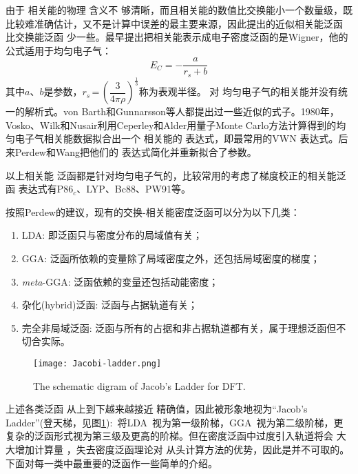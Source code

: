 由于%
相关能的物理%
{含}义不%
{够}清晰，而且相关能的数值比交换能小一个数量级，既比较难准确估计，又不是计算中误差的最主要来源，因此提出的{近似}相关能泛函%
比交换能泛函%
少一些。最早提出把相关能表示成电子密度泛函的是Wigner\cite{PR46-1002_1934}，他的公式适用于均匀电子气：
\begin{equation}
  E_C=-\dfrac a{r_s+b}
  \label{eq:dft-16}
\end{equation}
其中$a$、$b$是参数，$r_s$\,=\,$\left(\dfrac3{4\pi\rho}\right)^{\frac13}$称为表观半径。%
对%
均匀电子气的相关能并没有统一\linebreak 的解析式。von Barth\cite{JPC5-1629_1972}和Gunnarsson\cite{PRB13-4274_1976}等人都提出过一些近似的式子。1980年，\linebreak Vosko、Wilk和Nusair\cite{CJP58-1200_1980}利用Ceperley和Alder\cite{PRL45-566_1980}用量子Monte Carlo方法计算得到的{均匀电子气}相关能数据拟合出一个%
相关能的%
{表达}式，即最常用的VWN%
{表达}式。后来Perdew和Wang\cite{PRB45-13244_1992}把他们的%
{表达}式简化并重新拟合了参数。

以上相关能%
{泛函}都是针对均匀电子气的，比较常用的考虑了梯度校正的相关能泛函%
{表达}式有P86$_c$\cite{PRB33-8822_1986}、LYP\cite{PRB37-785_1988}、Bc88\cite{JCP88-1053_1988}、PW91\cite{PRB46-6671_1992,PRB48-4978_1993,PRB54-16533_1996,PRB57-14999_1998}等。

按照Perdew的建议\cite{Perdew-Schmidt}，现有的交换-相关能密度泛函可以分为以下几类：
\begin{enumerate}
  \item LDA: 即泛函只与密度分布的局域值有关；
  \item GGA: 泛函所依赖的变量除了局域密度之外，还包括局域密度的梯度；
  \item \textit{meta}-GGA: 泛函依赖的变量还包括动能密度；
  \item {杂化(hybrid)泛函}: 泛函与占据轨道有关；
  \item 完全非局域泛函: 泛函与所有的占据和非占据轨道都有关，属于理想泛函但不%
{切合实际}。
\end{enumerate}
\begin{figure}[!h]
\centering
\texttt{[image: Jacobi-ladder.png]}
\caption{\small The schematic digram of Jacob's Ladder for DFT.\cite{Perdew-Schmit_2001,Science298-759_2002}}
\label{Fig:Jacob-Ladder}
\end{figure}

上述{各类}泛函%
从上到下越来越接近%
精确值，因此被形象地视为``Jacob's Ladder''(登天梯，见图\ref{Fig:Jacob-Ladder}):~将\textrm{LDA~}视为第一级阶梯，\textrm{GGA~}视为第二级阶梯，更复杂的泛函形式视为第三级及更高的阶梯。\cite{PRL91-146401_2003}但在密度泛函中过度引入轨道将会%
{大大增加}计算量%
，失去密度泛函理论对%
从头计算方法的优势，因此是{并}不可取的。
下面对每一类中最重要的泛函作一些简单的介绍。


